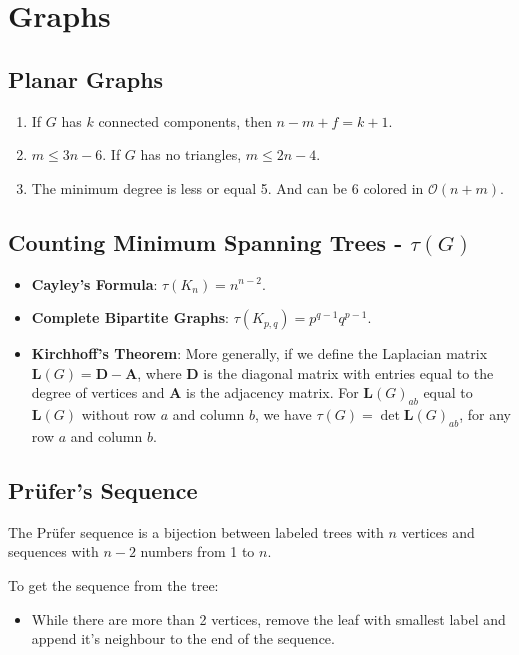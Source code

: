 \section{Graphs}

\subsection{Planar Graphs}
\begin{enumerate}
\item If $G$ has $k$ connected components, then $n - m + f = k + 1$.
\item $m \leq  3n - 6 $. If $G$ has no triangles, $m \leq 2n - 4$.
\item The minimum degree is less or equal 5. And can be $6$ colored in $\mathcal{O}(n+m)$.
\end{enumerate}

\subsection{Counting Minimum Spanning Trees - \texorpdfstring{$\tau(G)$}{}}

\begin{itemize}
    \item \textbf{Cayley's Formula}:
    $\tau(K_n) = n^{n-2}$.
    
    \item \textbf{Complete Bipartite Graphs}:
    $\tau(K_{p,q}) = p^{q-1}q^{p-1}$.
    
    \item \textbf{Kirchhoff's Theorem}:
    More generally, if we define the Laplacian matrix
    $\mathbf{L}(G) = \mathbf{D} - \mathbf{A}$, where $\mathbf{D}$ is the diagonal matrix with entries equal to the degree of vertices and $\mathbf{A}$ is the adjacency matrix. For $\mathbf{L}(G)_{ab}$ equal to $\mathbf{L}(G)$ without row $a$ and column $b$, we have $\tau(G) = \det{\mathbf{L}(G)_{ab}}$, for any row $a$ and column $b$.
    
\end{itemize}

\subsection{Prüfer's Sequence}
The Prüfer sequence is a bijection between labeled trees with $n$ vertices and sequences with $n-2$ numbers from 1 to $n$.

To get the sequence from the tree:

\begin{itemize}
    \item While there are more than 2 vertices, remove the leaf with smallest label and append it's neighbour to the end of the sequence.
\end{itemize}

